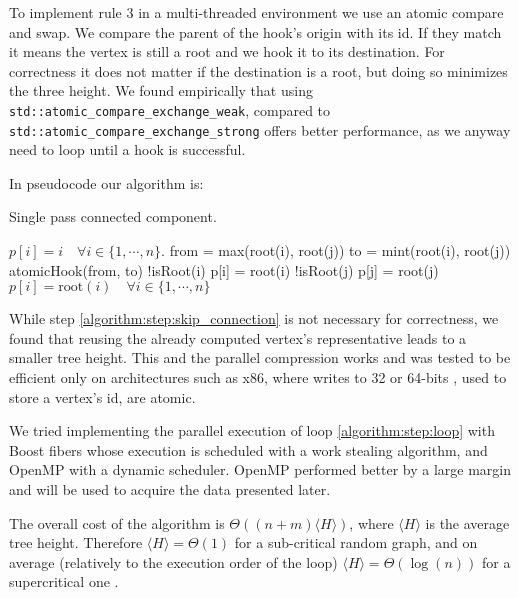 To implement rule $3$ in a multi-threaded environment we use an atomic compare and swap.
We compare the parent of the hook's origin with its id. If they match it means the vertex is still
a root and we hook it to its destination. For correctness it does not matter if the destination is
a root, but doing so minimizes the three height.
We found empirically that using \verb|std::atomic_compare_exchange_weak|,
compared to \verb|std::atomic_compare_exchange_strong| offers better performance, as we anyway need
to loop until a hook is successful.

In pseudocode our algorithm is:

\begin{algorithm}[H]
    \caption{Single pass connected component.}
    \label{algorithm:cc2}
    \begin{algorithmic}[1]
        \State $p[i] = i \quad \forall i \in \{1,\cdots, n\}$. %
         
\label{algorithm:step:loop}
                \State from = max(root(i), root(j))
                \State to = mint(root(i), root(j))
                \State  atomicHook(from, to)
        \EndWhile
        \State  \kif !isRoot(i) \kthen p[i] = root(i) \label{algorithm:step:skip_connection}
        \State  \kif !isRoot(j) \kthen p[j] = root(j)
        \EndFor
        \State $p[i] = \text{root}(i) \quad \forall i \in \{1,\cdots, n\}$ 
        \EndProcedure
    \end{algorithmic}
\end{algorithm}

While step \ref{algorithm:step:skip_connection} is not necessary for correctness, we found that
reusing the already computed vertex's representative leads to a smaller tree height. This and the
parallel compression works and was tested to
be efficient only on architectures such as x86, where writes to 32 or 64-bits , used to store a
vertex's id, are atomic.

We tried implementing the parallel execution of loop \ref{algorithm:step:loop} with  Boost fibers
\cite{Boost}
whose execution is scheduled with a work stealing algorithm, and OpenMP with a dynamic scheduler.
OpenMP performed better by a large margin and will be used to  acquire the data presented later.

The overall cost of the algorithm is $\Theta((n + m)\langle H \rangle)$, where $\langle H \rangle$
is
the average tree height. Therefore $\langle H \rangle = \Theta(1)$ for a sub-critical random graph,
and on average (relatively to the execution order of the loop) $\langle H \rangle = \Theta(\log(n))$
for a supercritical one \cite{RandomGraph}.

